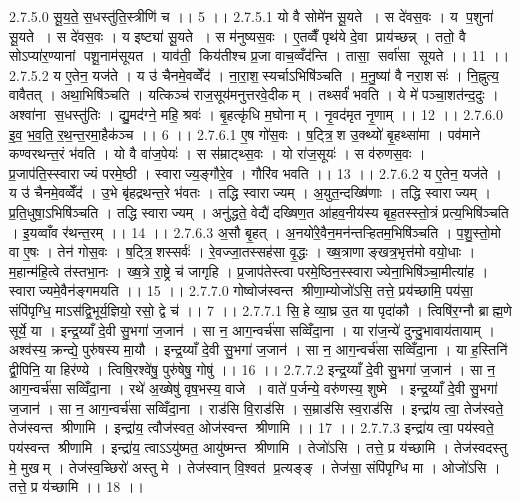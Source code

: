 2.7.5.0
सू॒य॒ते॒ स॒धस्तु॑ति॒स्त्रीणि॑ च ।। 5 ।।
2.7.5.1
यो वै सोमे॑न सू॒यते । स दे॑वस॒वः । य प॒शुना॑ सू॒यते । स दे॑वस॒वः । य इष्ट्या॑ सू॒यते । स म॑नुष्यस॒वः । ए॒तव्वैँ पृथ॑ये दे॒वा प्राय॑च्छन्न् । ततो॒ वै सोऽप्या॑र॒ण्यानां पशू॒नाम॑सूयत । याव॑ती॒ किय॑तीश्च प्र॒जा वाच॒व्वँद॑न्ति । तासा॒॒ सर्वा॑सा सूयते ।। 11 ।।
2.7.5.2
य ए॒तेन॒ यज॑ते । य उ॑ चैनमे॒वव्वेँद॑ । ना॒रा॒श॒स्यर्चाऽभिषि॑ञ्चति । म॒नु॒ष्या॑ वै नरा॒शसः॑ । नि॒ह्नुत्य॒ वावैतत् । अथा॒भिषि॑ञ्चति । यत्किञ्च॑ राज॒सूय॑मनुत्तरवे॒दीकम् । तथ्सर्वं॑ भवति । ये मे॑ पञ्चा॒शत॑न्द॒दुः । अश्वा॑ना स॒धस्तु॑तिः । द्यु॒मद॑ग्ने॒ महि॒ श्रवः॑ । बृ॒हत्कृ॑धि म॒घोनाम् । नृ॒वद॑मृत नृ॒णाम् ।। 12 ।।
2.7.6.0
इ॒व॒ भ॒व॒ति॒ र॒थ॒न्त॒रमा॒हैक॑ञ्च ।। 6 ।।
2.7.6.1
ए॒ष गो॑स॒वः । ष॒ट्त्रि॒॒श उ॒क्थ्यो॑ बृ॒हथ्सा॑मा । पव॑माने कण्वरथन्त॒रं भ॑वति । यो वै वा॑ज॒पेयः॑ । स स॑म्राट्थ्स॒वः । यो रा॑ज॒सूयः॑ । स व॑रुणस॒वः । प्र॒जाप॑ति॒स्स्वाराज्यं परमे॒ष्ठी । स्वाराज्य॒ङ्गौरे॒व । गौरि॑व भवति ।। 13 ।।
2.7.6.2
य ए॒तेन॒ यज॑ते । य उ॑ चैनमे॒वव्वेँद॑ । उ॒भे बृ॑हद्रथन्त॒रे भ॑वतः । तद्धि स्वाराज्यम् । अ॒युत॒न्दख्षि॑णाः । तद्धि स्वाराज्यम् । प्र॒ति॒धुषा॒ऽभिषि॑ञ्चति । तद्धि स्वाराज्यम् । अनु॑द्धते॒ वेद्यै॑ दख्षिण॒त आ॑हव॒नीय॑स्य बृह॒तस्स्तो॒त्रं प्रत्य॒भिषि॑ञ्चति । इ॒यव्वाँव र॑थन्त॒रम् ।। 14 ।।
2.7.6.3
अ॒सौ बृ॒हत् । अ॒नयो॑रे॒वैन॒मन॑न्तऱ्हितम॒भिषि॑ञ्चति । प॒शु॒स्तो॒मो वा ए॒षः । तेन॑ गोस॒वः । ष॒ट्त्रि॒॒शस्सर्वः॑ । रे॒वज्जा॒तस्सह॑सा वृ॒द्धः । ख्ष॒त्राणाङ्खत्र॒भृत्त॑मो वयो॒धाः । म॒हान्म॑हि॒त्वे त॑स्तभा॒नः । ख्ष॒त्रे रा॒ष्ट्रे च॑ जागृहि । प्र॒जाप॑तेस्त्वा परमे॒ष्ठिन॒स्स्वाराज्येना॒भिषि॑ञ्चा॒मीत्या॑ह । स्वाराज्यमे॒वैन॑ङ्गमयति ।। 15 ।।
2.7.7.0
गोष्वोज॑स्वन्त श्रीणा॒म्योजो॑ऽसि॒ तत्ते॒ प्रय॑च्छामि॒ पय॑सा॒ संपि॑पृग्धि॒ माऽस॑द्वि॒भूर्य॒ज्ञियो॒ रसो॒ द्वे च॑ ।। 7 ।।
2.7.7.1
सि॒॒हे व्या॒घ्र उ॒त या पृदा॑कौ । त्विषि॑र॒ग्नौ ब्राह्म॒णे सूर्ये॒ या । इन्द्र॒य्याँ दे॒वी सु॒भगा॑ ज॒जान॑ । सा न॒ आग॒न्वर्च॑सा सव्विँदा॒ना । या रा॑ज॒न्ये॑ दुन्दु॒भावाय॑तायाम् । अश्व॑स्य॒ क्रन्द्ये॒ पुरु॑षस्य मा॒यौ । इन्द्र॒य्याँ दे॒वी सु॒भगा॑ ज॒जान॑ । सा न॒ आग॒न्वर्च॑सा सव्विँदा॒ना । या ह॒स्तिनि॑ द्वी॒पिनि॒ या हिर॑ण्ये । त्विषि॒रश्वे॑षु॒ पुरु॑षेषु॒ गोषु॑ ।। 16 ।।
2.7.7.2
इन्द्र॒य्याँ दे॒वी सु॒भगा॑ ज॒जान॑ । सा न॒ आग॒न्वर्च॑सा सव्विँदा॒ना । रथे॑ अ॒ख्षेषु॑ वृष॒भस्य॒ वाजे । वाते॑ प॒र्जन्ये॒ वरु॑णस्य॒ शुष्मे । इन्द्र॒य्याँ दे॒वी सु॒भगा॑ ज॒जान॑ । सा न॒ आग॒न्वर्च॑सा सव्विँदा॒ना । राड॑सि वि॒राड॑सि । स॒म्राड॑सि स्व॒राड॑सि । इन्द्रा॑य त्वा॒ तेज॑स्वते॒ तेज॑स्वन्त श्रीणामि । इन्द्रा॑य॒ त्वौज॑स्वत॒ ओज॑स्वन्त श्रीणामि ।। 17 ।।
2.7.7.3
इन्द्रा॑य त्वा॒ पय॑स्वते॒ पय॑स्वन्त श्रीणामि । इन्द्रा॑य॒ त्वाऽऽयु॑ष्मत॒ आयु॑ष्मन्त श्रीणामि । तेजो॑ऽसि । तत्ते॒ प्र य॑च्छामि । तेज॑स्वदस्तु मे॒ मुखम् । तेज॑स्व॒च्छिरो॑ अस्तु मे । तेज॑स्वान् वि॒श्वत॑ प्र॒त्यङ्ङ् । तेज॑सा॒ संपि॑पृग्धि मा । ओजो॑ऽसि । तत्ते॒ प्र य॑च्छामि ।। 18 ।।
